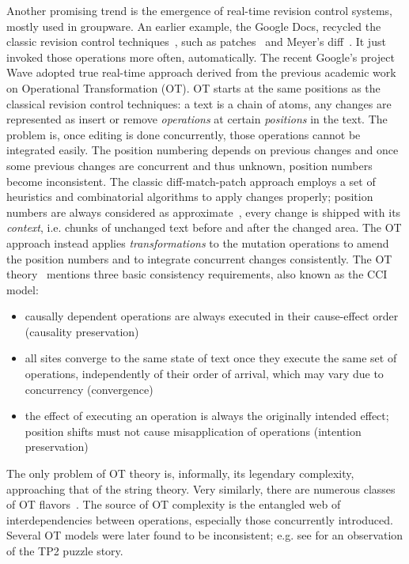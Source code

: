 \documentclass{acm_proc_article-sp}
\begin{document}
Another promising trend is the emergence of real-time revision control systems, mostly used in groupware.
An earlier example, the Google Docs, recycled the classic revision control techniques~\cite{diff-match-patch}, such as patches~\cite{patch} and Meyer's diff~\cite{meyers-diff}.
It just invoked those operations more often, automatically.
The recent Google's project Wave adopted true real-time approach derived from the previous academic work on Operational Transformation (OT).
OT starts at the same positions as the classical revision control techniques: a text is a chain of atoms, any changes are represented as insert or remove \emph{operations} at certain \emph{positions} in the
text.
The problem is, once editing is done concurrently, those operations cannot be integrated easily.
The position numbering depends on previous changes and once some previous changes are concurrent and thus unknown, position numbers become inconsistent.
The classic diff-match-patch approach employs a set of heuristics and combinatorial algorithms to apply changes properly; position numbers are always considered as approximate~\cite{fraser}, every change is shipped with its \emph{context}, i.e. chunks of unchanged text before and after the changed area.
The OT approach instead applies \emph{transformations} to the mutation operations to amend the position numbers and to integrate concurrent changes consistently. The OT theory~\cite{sun-achieving} mentions three basic consistency requirements, also known as the CCI model: 
\begin{itemize}
\item causally dependent operations are always executed in their cause-effect order (causality preservation)
\item all sites converge to the same state of text once they execute the same set of operations, independently of their order of arrival, which may vary due to concurrency (convergence)
\item the effect of executing an operation is always the originally intended effect; position shifts must not cause misapplication of operations (intention preservation)
\end{itemize}
The only problem of OT theory is, informally, its legendary complexity, approaching that of the string theory.
Very similarly, there are numerous classes of OT flavors~\cite{ot}.
The source of OT complexity is the entangled web of interdependencies between operations, especially those concurrently introduced.
Several OT models were later found to be inconsistent; e.g. see \cite{woot} for an observation of the TP2 puzzle story.
\end{document}

